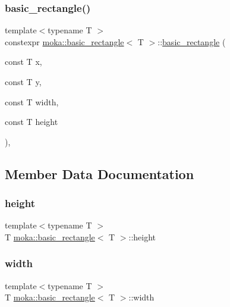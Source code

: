 \subsubsection{\texorpdfstring{basic\_rectangle()}{basic\_rectangle()}}
{\footnotesize\ttfamily template$<$typename T $>$ \\
constexpr \mbox{\hyperlink{structmoka_1_1basic__rectangle}{moka\+::basic\+\_\+rectangle}}$<$ T $>$\+::\mbox{\hyperlink{structmoka_1_1basic__rectangle}{basic\+\_\+rectangle}} (\begin{DoxyParamCaption}\item[{const T}]{x,  }\item[{const T}]{y,  }\item[{const T}]{width,  }\item[{const T}]{height }\end{DoxyParamCaption})\hspace{0.3cm}{\ttfamily [inline]}, {\ttfamily [noexcept]}}



\subsection{Member Data Documentation}
\mbox{\label{structmoka_1_1basic__rectangle_ac773540b14150160608c2522029bbd37}} 
\subsubsection{\texorpdfstring{height}{height}}
{\footnotesize\ttfamily template$<$typename T $>$ \\
T \mbox{\hyperlink{structmoka_1_1basic__rectangle}{moka\+::basic\+\_\+rectangle}}$<$ T $>$\+::height}

\mbox{\label{structmoka_1_1basic__rectangle_a0ed8e9c98975c0198ba3b9952a541bcd}} 
\subsubsection{\texorpdfstring{width}{width}}
{\footnotesize\ttfamily template$<$typename T $>$ \\
T \mbox{\hyperlink{structmoka_1_1basic__rectangle}{moka\+::basic\+\_\+rectangle}}$<$ T $>$\+::width}

